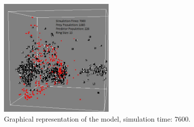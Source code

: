 \documentclass[letterpaper]{article}
\numberwithin{equation}{section}
\begin{document}
\begin{figure}[h]
	\centering
	\label{fig:screenshot-simTime7600-2-prey}
	\includegraphics[width=0.5\textwidth]{../tex/images/simTime7600}
	\caption[Graphical representation of the model (simulation time: 7600)]{Graphical representation of the model, simulation time: 7600.}
\end{figure}
\end{document}
